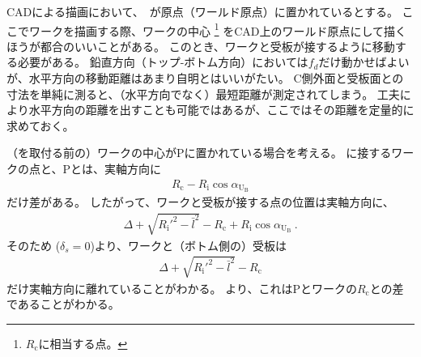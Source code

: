 

CADによる描画において、\TableCenter　が原点（ワールド原点）に置かれているとする。
ここでワークを描画する際、ワークの中心
\footnote{$R_\mathrm c$に相当する点。}\relax
をCAD上のワールド原点にして描くほうが都合のいいことがある。
このとき、ワークと受板が接するように移動する必要がある。
鉛直方向（トップ-ボトム方向）においては$f_d$だけ動かせばよいが、水平方向の移動距離はあまり自明とはいいがたい。
C側外面と受板面との寸法を単純に測ると、（水平方向でなく）最短距離が測定されてしまう。
工夫により水平方向の距離を出すことも可能ではあるが、ここではその距離を定量的に求めておく。



（\Spacer を取付る前の）ワークの中心が\TableCenter Pに置かれている場合を考える。
\BottomSideReceiverPlate に接するワークの点と、\TableCenter Pとは、実軸方向に
\begin{align*}
  R_\mathrm c-R_\mathrm i\cos\alpha_{\mathrm U_\mathrm B}
\end{align*}
だけ差がある。
したがって、ワークと受板が接する点の位置は実軸方向に、
\begin{align*}
  \Delta+\sqrt{R_\mathrm i'^2-\bar l^2}-R_\mathrm c+R_\mathrm i\cos\alpha_{\mathrm U_\mathrm B}\ .
\end{align*}
そのため ($\delta_s = 0$)より、ワークと（ボトム側の）受板は
\begin{align*}
  \Delta+\sqrt{R_\mathrm i'^2-\bar l^2}-R_\mathrm c
\end{align*}
だけ実軸方向に離れていることがわかる。
より、これは\TableCenter Pとワークの\CenterCurvature$R_\mathrm c$との差であることがわかる。



